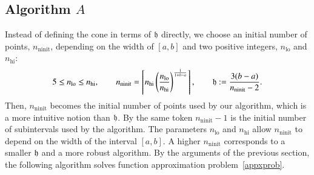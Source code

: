 \documentclass[review]{elsarticle}
\theoremstyle{definition}
\DeclareMathOperator{\lo}{lo}
\DeclareMathOperator{\ninit}{ninit}
\begin{document}
\subsection{Algorithm $A$} \label{subsec:appxalgo}
Instead of defining the cone in terms of $\mathfrak{h}$ directly, we choose an initial number of points, $n_{\ninit}$, depending on the width of $[a,b]$ and two positive integers, $n_{\lo}$ and $n_{\text{hi}}$:
\begin{equation}
\label{nodefinition}
5 \le n_{\lo} \le n_{\text{hi}}, \qquad n_{\ninit} = \left\lceil n_{\text{hi}}
\left(\frac{n_{\lo}}{n_{\text{hi}}}\right)^{\frac{1}{1+b-a}}\right\rceil,  \qquad \fh := \frac{3(b-a)}{n_{\ninit}-2}.
\end{equation}
Then, $n_{\ninit}$ becomes the initial number of points used by our algorithm,  which is a more intuitive notion than $\mathfrak{h}$.  By the same token $n_{\ninit} -1$ is the initial number of subintervals used by the algorithm.  The parameters $n_{\lo}$ and $n_{\text{hi}}$ allow $n_{\ninit}$ to depend on the width of the interval $[a,b]$.  A higher $n_{\ninit}$ corresponds to a smaller $\mathfrak{h}$ and a more robust algorithm.  By the arguments of the previous section, the following algorithm solves function approximation problem~\eqref{appxprob}.
\end{document}
